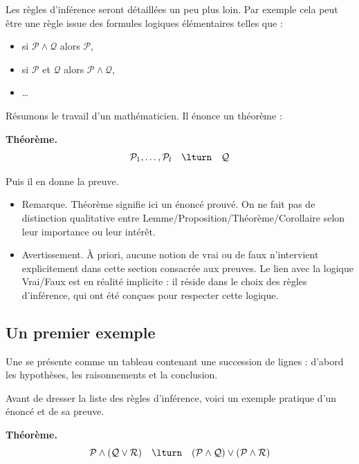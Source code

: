 \documentclass[11pt,class=report,crop=false]{standalone}
\begin{document}
Les règles d'inférence seront détaillées un peu plus loin. Par exemple cela peut être une règle issue des formules logiques élémentaires telles que :
\begin{itemize}
	\item si $\mathcal{P} \land \mathcal{Q}$ alors $\mathcal{P}$,
	\item si $\mathcal{P}$ et $\mathcal{Q}$ alors $\mathcal{P} \land \mathcal{Q}$,
	\item \ldots
\end{itemize}


\bigskip

Résumons le travail d'un mathématicien. Il énonce un théorème :

\textbf{Théorème.}
\[
	\mathcal{P}_1, \ldots, \mathcal{P}_l \quad \lturn \quad \mathcal{Q}
\]	
\medskip

Puis il en donne la preuve.

\begin{itemize}
\item  Remarque. \og{}Théorème\fg{} signifie ici un énoncé prouvé. On ne fait pas de distinction qualitative entre Lemme/Proposition/Théorème/Corollaire selon leur importance ou leur intérêt.

\item Avertissement. À priori, aucune notion de vrai ou de faux n'intervient explicitement dans cette section consacrée aux preuves. Le lien avec la logique Vrai/Faux est en réalité implicite : il réside dans le choix des règles d'inférence, qui ont été conçues pour respecter cette logique.
\end{itemize}



\subsection{Un premier exemple}

Une  se présente comme un tableau contenant une succession de lignes : d'abord les hypothèses, les raisonnements et la conclusion.





Avant de dresser la liste des règles d'inférence, voici un exemple pratique d'un énoncé et de sa preuve.

\textbf{Théorème.}
\[
\mathcal{P} \land (\mathcal{Q} \lor \mathcal{R}) \quad \lturn \quad (\mathcal{P} \land \mathcal{Q}) \lor (\mathcal{P} \land \mathcal{R})
\]
\end{document}
